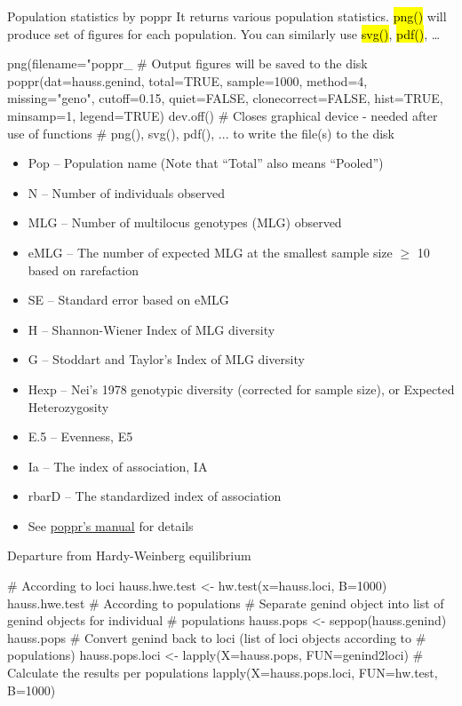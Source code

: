 \documentclass[compress, ucs, xelatex, 11pt, xcolor=svgnames,
  hyperref={
    bookmarks=true,
    unicode=true,
    colorlinks=true,
    pdftitle={Molecular data in R},
    plainpages=false,
    pdfauthor={Vojtech Zeisek},
    pdfsubject={Course about phylogeny and evolution in R},
    pdfcreator={XeLaTeX},
    pdfkeywords={R, evolution, phylogeny, molecular data},
    linkcolor=Tomato,
    anchorcolor=SaddleBrown,
    citecolor=Goldenrod,
    filecolor=DarkMagenta,
    menucolor=Sienna,
    urlcolor=DarkTurquoise,
    pdftex},
  url={hyphens, lowtilde} %
  ]{beamer}
\renewcommand{\texttt}[1]{\hl{\ttfamily #1}}
\begin{document}
\begin{frame}[fragile]{Population statistics by poppr}
It returns various population statistics. \texttt{png()} will produce set of figures for each population. You can similarly use \texttt{svg()}, \texttt{pdf()}, \ldots
  \begin{spluscode}
    png(filename="poppr_%
      # Output figures will be saved to the disk
    poppr(dat=hauss.genind, total=TRUE, sample=1000, method=4,
      missing="geno", cutoff=0.15, quiet=FALSE, clonecorrect=FALSE,
      hist=TRUE, minsamp=1, legend=TRUE)
    dev.off() # Closes graphical device - needed after use of functions
              # png(), svg(), pdf(), ... to write the file(s) to the disk
  \end{spluscode}
  \begin{tiny}
    \begin{multicols}{2}
      \begin{itemize}
	\item Pop -- Population name (Note that ``Total'' also means ``Pooled'')
	\item N -- Number of individuals observed
	\item MLG -- Number of multilocus genotypes (MLG) observed
	\item eMLG -- The number of expected MLG at the smallest sample size $\geq$ 10 based on rarefaction
	\item SE -- Standard error based on eMLG
	\item H -- Shannon-Wiener Index of MLG diversity
	\item G -- Stoddart and Taylor's Index of MLG diversity
	\item Hexp -- Nei's 1978 genotypic diversity (corrected for sample size), or Expected Heterozygosity
	\item E.5 -- Evenness, E5
	\item Ia -- The index of association, IA
	\item rbarD -- The standardized index of association
	\item See \href{http://grunwaldlab.cgrb.oregonstate.edu/primer-population-genetic-analysis-r/installation}{poppr's manual} for details
      \end{itemize}
    \end{multicols}
  \end{tiny}
\end{frame}

\begin{frame}[fragile]{Departure from Hardy-Weinberg equilibrium}
  \begin{spluscode}
    # According to loci
    hauss.hwe.test <- hw.test(x=hauss.loci, B=1000)
    hauss.hwe.test
    # According to populations
    # Separate genind object into list of genind objects for individual
    # populations
    hauss.pops <- seppop(hauss.genind)
    hauss.pops
    # Convert genind back to loci (list of loci objects according to
    # populations)
    hauss.pops.loci <- lapply(X=hauss.pops, FUN=genind2loci)
    # Calculate the results per populations
    lapply(X=hauss.pops.loci, FUN=hw.test, B=1000)
  \end{spluscode}
\end{frame}
\end{document}
